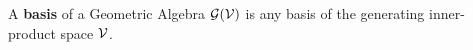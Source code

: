 \begin{definition}[Basis]\label{d:basis}
	A \textbf{basis} of a Geometric Algebra $\mathcal{G}(\mathcal{V})$ is any basis of the generating inner-product space $\mathcal{V}$.
\end{definition}
